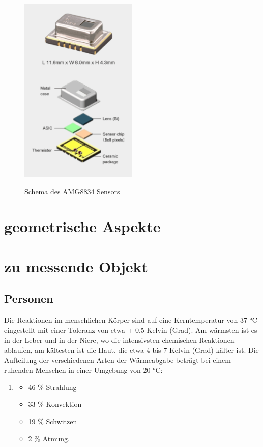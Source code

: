 \begin{figure}[H]
	\centering
	\includegraphics[width=0.5\textwidth]
	{fig/grid_eye_aufbau.PNG}
	\caption[Schema des AMG8834 Sensors]{Schema des AMG8834 Sensors} \protect\cite{AMG8834}
	\label{fig:sens}
\end{figure}
\section{geometrische Aspekte}

\section{zu messende Objekt}


\subsection{Personen}
Die Reaktionen im menschlichen Körper sind auf eine Kerntemperatur von 37 °C eingestellt
mit einer Toleranz von etwa + 0,5 Kelvin (Grad). Am wärmsten ist es in der Leber und in der
Niere, wo die intensivsten chemischen Reaktionen ablaufen, am kältesten ist die Haut, die
etwa 4 bis 7 Kelvin (Grad) kälter ist.
Die Aufteilung der verschiedenen Arten der Wärmeabgabe beträgt bei einem ruhenden
Menschen in einer Umgebung von 20 °C:

\begin{enumerate}
\item 
\begin{itemize}
	\item  46 \% Strahlung
	\item  33 \% Konvektion
	\item  19 \% Schwitzen
	\item   2 \% Atmung.
\end{itemize}
\end{enumerate}	


